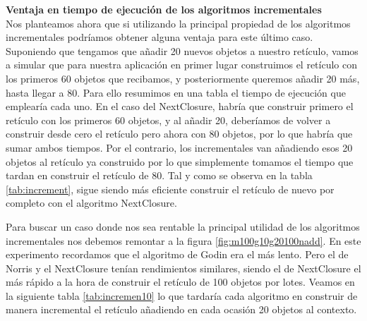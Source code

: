 \documentclass[oneside,openright,titlepage,numbers=noenddot,openany,headinclude,footinclude=true,
cleardoublepage=empty,abstractoff,BCOR=5mm,paper=a4,fontsize=12pt,main=spanish]{scrreprt}
\begin{document}
\begin{itemize}
\textbf{Ventaja en tiempo de ejecución de los algoritmos incrementales}\\

Nos planteamos ahora que si utilizando la principal propiedad de los algoritmos incrementales podríamos obtener alguna ventaja para este último caso. Suponiendo que tengamos que añadir 20 nuevos objetos a nuestro retículo, vamos a simular que para nuestra aplicación en primer lugar construimos el retículo con los primeros 60 objetos que recibamos, y posteriormente queremos añadir 20 más, hasta llegar a 80. Para ello resumimos en una tabla el tiempo de ejecución que emplearía cada uno. En el caso del NextClosure, habría que construir primero el retículo con los primeros 60 objetos, y al añadir 20, deberíamos de volver a construir desde cero el retículo pero ahora con 80 objetos, por lo que habría que sumar ambos tiempos. Por el contrario, los incrementales van añadiendo esos 20 objetos al retículo ya construido por lo que simplemente tomamos el tiempo que tardan en construir el retículo de 80. Tal y como se observa en la tabla \ref{tab:increment}, sigue siendo más eficiente construir el retículo de nuevo por completo con el algoritmo NextClosure.

\begin{table}[H]
\caption{Tabla comparativa de tiempos de ejecución en ms para $|\M|=100$, que tardaría cada algoritmo en añadir 20 objetos al retículo.}
\label{tab:increment}
\end{table}

\end{itemize}

Para buscar un caso donde nos sea rentable la principal utilidad de los algoritmos incrementales nos debemos remontar a la figura \ref{fig:m100g10g20100nadd}. En este experimento recordamos que el algoritmo de Godin era el más lento. Pero el de Norris y el NextClosure tenían rendimientos similares, siendo el de NextClosure el más rápido a la hora de construir el retículo de 100 objetos por lotes. Veamos en la siguiente tabla \ref{tab:incremen10} lo que tardaría cada algoritmo en construir de manera incremental el retículo añadiendo en cada ocasión 20 objetos al contexto.
\end{document}
